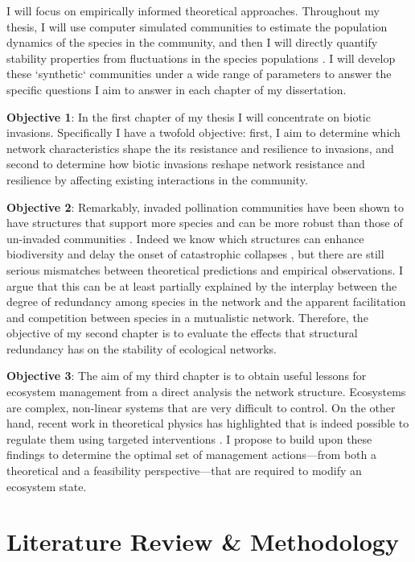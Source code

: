 \documentclass[a4paper]{article}
\begin{document}
I will focus on empirically informed theoretical approaches.
Throughout my thesis, I will use computer simulated communities to estimate the population dynamics of the species in the community, and then I will directly quantify stability properties from fluctuations in the species populations \autocite{Bastolla2009, Garcia-Algarra2013}.
I will develop these `synthetic` communities under a wide range of parameters to answer the specific questions I aim to answer in each chapter of my dissertation.

\textbf{Objective 1}: In the first chapter of my thesis I will concentrate on biotic invasions.
Specifically I have a twofold objective: first, I aim to determine which network characteristics shape the its resistance and resilience to invasions, and second to determine how biotic invasions reshape network resistance and resilience by affecting existing interactions in the community.

\textbf{Objective 2}: Remarkably, invaded pollination communities have been shown to have structures that support more species \autocite{Stouffer2014} and can be more robust than those of un-invaded communities \autocite{Albrecht2014}.
Indeed we know which structures can enhance biodiversity \autocite{Bastolla2009} and delay the onset of catastrophic collapses \autocite{Lever2014}, but there are still serious mismatches between theoretical predictions and empirical observations.
I argue that this can be at least partially explained by the interplay between the degree of redundancy among species in the network and the apparent facilitation and competition between species in a mutualistic network.
Therefore, the objective of my second chapter is to evaluate the effects that structural redundancy has on the stability of ecological networks.

\textbf{Objective 3}: The aim of my third chapter is to obtain useful lessons for ecosystem management from a direct analysis the network structure.
Ecosystems are complex, non-linear systems that are very difficult to control.
On the other hand, recent work in theoretical physics has highlighted that is indeed possible to regulate them using targeted interventions \autocite{Cornelius2013}.
I propose to build upon these findings to determine the optimal set of management actions---from both a theoretical and a feasibility perspective---that are required to modify an ecosystem state.

\section*{Literature Review \& Methodology}
\end{document}
